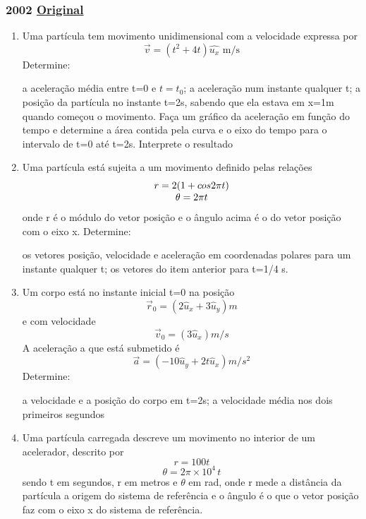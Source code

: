 \documentclass[12pt,a4paper]{article}
\newcommand{\original}[1]{\tiny \href{#1}{Original} \normalsize}
\begin{document}
\newpage
\subsubsection{2002 \original{https://drive.google.com/open?id=15UxEYcIDLcGpL-iu4EZDOO-ymHzOVPLg}}

\begin{enumerate}
\item Uma partícula tem movimento unidimensional com a velocidade expressa por $$\vec{v} = (t^2 + 4t) \hat{u_x} \text{ m/s}$$ Determine:
\begin{tasks}
\task a aceleração média entre t=0 e $t=t_0$;
\task a aceleração num instante qualquer t;
\task a posição da partícula no instante t=2s, sabendo que ela estava em x=1m quando começou o movimento.
\task Faça um gráfico da aceleração em função do tempo e determine a área contida pela curva e o eixo do tempo para o intervalo de t=0 até t=2s. Interprete o resultado
\end{tasks}


\item Uma partícula está sujeita a um movimento definido pelas relações $$\begin{array}c r = 2(1+cos2\pi t) \\ \theta = 2 \pi t \end{array}$$ onde r é o módulo do vetor posição e o ângulo acima é o do vetor posição com o eixo x. Determine:

\begin{tasks}
\task os vetores posição, velocidade e aceleração em coordenadas polares para um instante qualquer t;
\task os vetores do item anterior para t=1/4 s.
\end{tasks}

\item Um corpo está no instante inicial t=0 na posição $$\vec{r}_0 = (2\hat{u}_x + 3 \hat{u}_y)m$$ e com velocidade $$\vec{v}_0 = (3\hat{u}_x) m/s$$ A aceleração a que está submetido é $$\vec{a} = (-10 \hat{u}_y + 2t \hat{u}_x) m/s^2$$ Determine:

\begin{tasks}
\task a velocidade e a posição do corpo em t=2s;
\task a velocidade média nos dois primeiros segundos
\end{tasks}

\item Uma partícula carregada descreve um movimento no interior de um acelerador, descrito por $$r=100t$$ $$\theta = 2\pi \times 10^4\, t$$ sendo t em segundos, r em metros e $\theta$ em rad, onde r mede a distância da partícula a origem do sistema de referência e o ângulo é o que o vetor posição faz com o eixo x do sistema de referência.


\end{enumerate}
\end{document}
